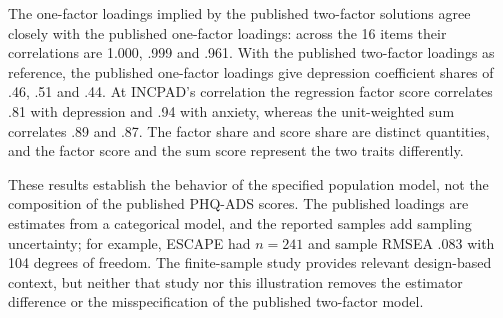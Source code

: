 The one-factor loadings implied by the published two-factor solutions agree closely with the published one-factor loadings: across the 16 items their correlations are 1.000, .999 and .961. With the published two-factor loadings as reference, the published one-factor loadings give depression coefficient shares of .46, .51 and .44. At INCPAD's correlation the regression factor score correlates .81 with depression and .94 with anxiety, whereas the unit-weighted sum correlates .89 and .87. The factor share and score share are distinct quantities, and the factor score and the sum score represent the two traits differently.

These results establish the behavior of the specified population model, not the composition of the published PHQ-ADS scores. The published loadings are estimates from a categorical model, and the reported samples add sampling uncertainty; for example, ESCAPE had $n=241$ and sample RMSEA .083 with 104 degrees of freedom. The finite-sample study provides relevant design-based context, but neither that study nor this illustration removes the estimator difference or the misspecification of the published two-factor model.
